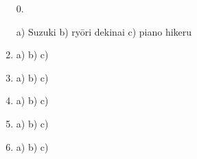 \documentclass[uplatex,dvipdfmx,b5paper,english,10pt]{jsbook}
\begin{document}
\begin{enumerate}
 \item[0.] \hrulefill\par
	   \vspace{-1.2\baselineskip}\hspace{.5em}a) Suzuki  \hspace{6.77em} b) ry\=ori dekinai \hspace{6.12em} c) piano hikeru
	   \vspace{.2\baselineskip}
 \item \hrulefill\par
       \vspace{-1.2\baselineskip}\hspace{.5em}a) \hspace{10em} b) \hspace{12em} c)
       \vspace{.2\baselineskip}
 \item \hrulefill\par
       \vspace{-1.2\baselineskip}\hspace{.5em}a) \hspace{10em} b) \hspace{12em} c)
       \vspace{.2\baselineskip}
 \item \hrulefill\par
       \vspace{-1.2\baselineskip}\hspace{.5em}a) \hspace{10em} b) \hspace{12em} c)
       \vspace{.2\baselineskip}
 \item \hrulefill\par
       \vspace{-1.2\baselineskip}\hspace{.5em}a) \hspace{10em} b) \hspace{12em} c)
       \vspace{.2\baselineskip}
 \item \hrulefill\par
       \vspace{-1.2\baselineskip}\hspace{.5em}a) \hspace{10em} b) \hspace{12em} c)
       \vspace{.2\baselineskip}
\end{enumerate}
\end{document}
